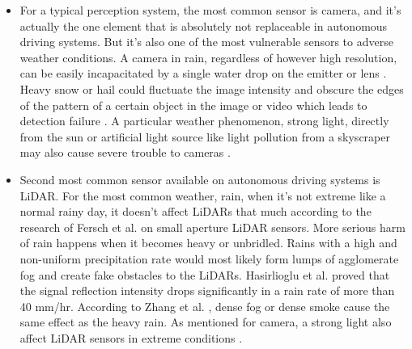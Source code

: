 \documentclass[rnd]{mas_proposal}
\begin{document}
\begin{itemize}
      \item For a typical perception system, the most common sensor is camera, and it's actually the one element that is absolutely not replaceable in autonomous driving systems. But it's also one of the most vulnerable sensors to adverse weather conditions. A camera in rain, regardless of however high resolution, can be easily incapacitated by a single water drop on the emitter or lens \cite{mardirosian2021LiDAR}. Heavy snow or hail could fluctuate the image intensity and obscure the edges of the pattern of a certain object in the image or video which leads to detection failure \cite{zang2019impact}. A particular weather phenomenon, strong light, directly from the sun or artificial light source like light pollution from a skyscraper may also cause severe trouble to cameras \cite{acarballo2020libre}.

      \item Second most common sensor available on autonomous driving systems is LiDAR. For the most common weather, rain, when it’s not extreme like a normal rainy day, it doesn’t affect LiDARs that much according to the research of Fersch et al. \cite{fersch2016influence} on small aperture LiDAR sensors. More serious harm of rain happens when it becomes heavy or unbridled. Rains with a high and non-uniform precipitation rate would most likely form lumps of agglomerate fog and create fake obstacles to the LiDARs. Hasirlioglu et al. \cite{hasirlioglu2016modeling} proved that the signal reflection intensity drops significantly in a rain rate of more than 40 mm/hr. According to Zhang et al. \cite{Zhang2021Dec}, dense fog or dense smoke cause the same effect as the heavy rain. As mentioned for camera, a strong light also affect LiDAR sensors in extreme conditions \cite{acarballo2020libre}.


\end{itemize}
\end{document}
